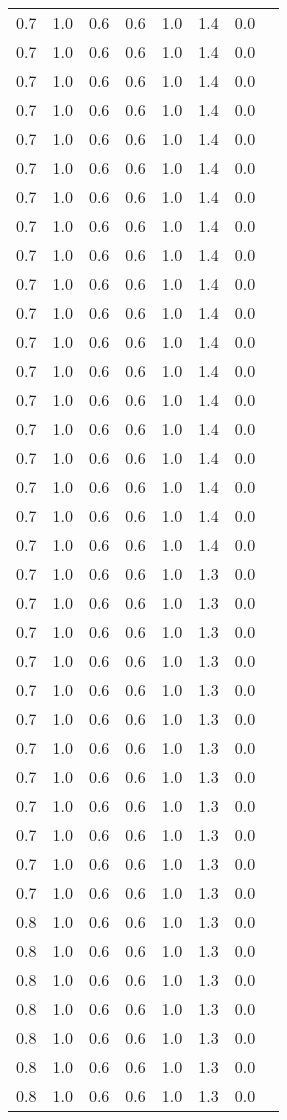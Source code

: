 \begin{tabular}{L{1in}|L{1in}|L{1in}|L{1in}|L{1in}|L{1in}|L{1in}|L{1in}}
0.7&1.0&0.6&0.6&1.0&1.4&0.0\\
0.7&1.0&0.6&0.6&1.0&1.4&0.0\\
0.7&1.0&0.6&0.6&1.0&1.4&0.0\\
0.7&1.0&0.6&0.6&1.0&1.4&0.0\\
0.7&1.0&0.6&0.6&1.0&1.4&0.0\\
0.7&1.0&0.6&0.6&1.0&1.4&0.0\\
0.7&1.0&0.6&0.6&1.0&1.4&0.0\\
0.7&1.0&0.6&0.6&1.0&1.4&0.0\\
0.7&1.0&0.6&0.6&1.0&1.4&0.0\\
0.7&1.0&0.6&0.6&1.0&1.4&0.0\\
0.7&1.0&0.6&0.6&1.0&1.4&0.0\\
0.7&1.0&0.6&0.6&1.0&1.4&0.0\\
0.7&1.0&0.6&0.6&1.0&1.4&0.0\\
0.7&1.0&0.6&0.6&1.0&1.4&0.0\\
0.7&1.0&0.6&0.6&1.0&1.4&0.0\\
0.7&1.0&0.6&0.6&1.0&1.4&0.0\\
0.7&1.0&0.6&0.6&1.0&1.4&0.0\\
0.7&1.0&0.6&0.6&1.0&1.4&0.0\\
0.7&1.0&0.6&0.6&1.0&1.4&0.0\\
0.7&1.0&0.6&0.6&1.0&1.3&0.0\\
0.7&1.0&0.6&0.6&1.0&1.3&0.0\\
0.7&1.0&0.6&0.6&1.0&1.3&0.0\\
0.7&1.0&0.6&0.6&1.0&1.3&0.0\\
0.7&1.0&0.6&0.6&1.0&1.3&0.0\\
0.7&1.0&0.6&0.6&1.0&1.3&0.0\\
0.7&1.0&0.6&0.6&1.0&1.3&0.0\\
0.7&1.0&0.6&0.6&1.0&1.3&0.0\\
0.7&1.0&0.6&0.6&1.0&1.3&0.0\\
0.7&1.0&0.6&0.6&1.0&1.3&0.0\\
0.7&1.0&0.6&0.6&1.0&1.3&0.0\\
0.7&1.0&0.6&0.6&1.0&1.3&0.0\\
0.8&1.0&0.6&0.6&1.0&1.3&0.0\\
0.8&1.0&0.6&0.6&1.0&1.3&0.0\\
0.8&1.0&0.6&0.6&1.0&1.3&0.0\\
0.8&1.0&0.6&0.6&1.0&1.3&0.0\\
0.8&1.0&0.6&0.6&1.0&1.3&0.0\\
0.8&1.0&0.6&0.6&1.0&1.3&0.0\\
0.8&1.0&0.6&0.6&1.0&1.3&0.0\\

\end{tabular}
